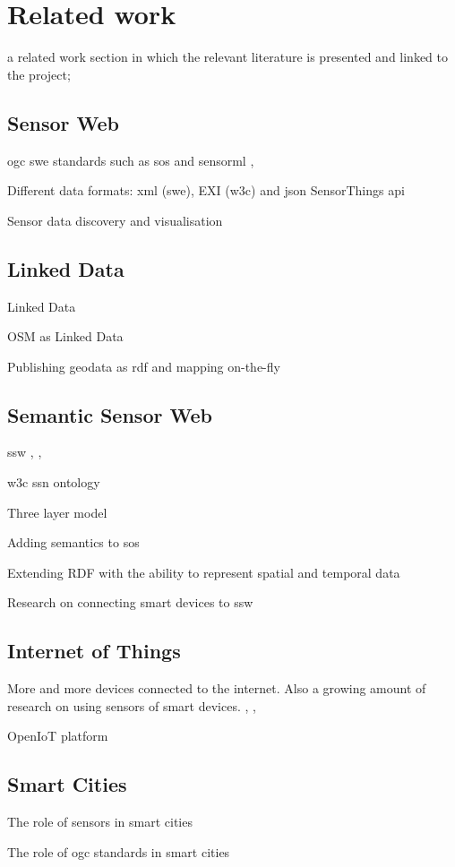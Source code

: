 \chapter{Related work}
\label{chap:rw}

a related work section in which the relevant literature is presented and linked to the project;


\section{Sensor Web}
\ac{ogc} \ac{swe} standards such as \ac{sos} and \ac{sensorml} \citep{SW:OGC}, \citep{SW:Botts}

Different data formats: \ac{xml} (\ac{swe}), EXI (\ac{w3c}) and \ac{json} SensorThings \ac{api} \citep{IOT:Zanelli}

Sensor data discovery \citep{SW:OGC2} and visualisation \citep{SW:Yoo}


\section{Linked Data}
Linked Data \citep{LD:Berners-lee}

OSM as Linked Data \citep{LD:Auer}

Publishing geodata as \ac{rdf} and mapping on-the-fly \citep{LD:Missier}


\section{Semantic Sensor Web}
\ac{ssw} \citep{SSW:Sheth}, \citep{SSW:deMel}, \citep{SSW:Bakillah}

\ac{w3c} \ac{ssn} ontology \citep{SSW:SSN_incubatorGroup}

Three layer model 

Adding semantics to \ac{sos} \citep{SSW:Henson}

Extending RDF with the ability to represent spatial and temporal data \citep{SSW:Koubarakis}

Research on connecting smart devices to \ac{ssw} \citep{SSW:Vera}  


\section{Internet of Things}
More and more devices connected to the internet. Also a growing amount of research on using sensors of smart devices. \citep{IOT:Waher}, \citep{SSW:Calbimonte}, \citep{IOT:Zarko}


OpenIoT platform \citep{IOT:Calbimonte}


\section{Smart Cities}
The role of sensors in smart cities \citep{IOT:Zanelli}

The role of \ac{ogc} standards in smart cities \citep{SC:OGC}
